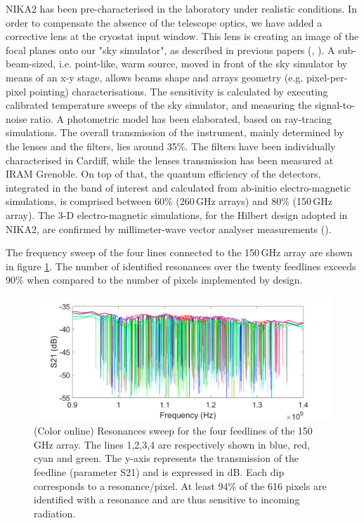 \documentclass[]{aa} %
\begin{document}
NIKA2 has been pre-characterised in the laboratory under realistic conditions. In order to compensate the absence of the telescope optics, we have added a corrective lens at the cryostat input window. This lens is creating an image of the focal planes onto our "sky simulator", as described in previous papers (\cite{Catalano2014}, \cite{Monfardini2011}). A sub-beam-sized, i.e. point-like, warm source, moved in front of the sky simulator by means of an x-y stage, allows beams shape and arrays geometry (e.g. pixel-per-pixel pointing) characterisations. The sensitivity is calculated by executing calibrated temperature sweeps of the sky simulator, and measuring the signal-to-noise ratio. A photometric model has been elaborated, based on ray-tracing simulations. The overall transmission of the instrument, mainly determined by the lenses and the filters, lies around 35\%. The filters have been individually characterised in Cardiff, while the lenses transmission has been measured at IRAM Grenoble. On top of that, the quantum efficiency of the detectors, integrated in the band of interest and calculated from ab-initio electro-magnetic simulations, is comprised between 60\% (260\,GHz arrays) and 80\% (150\,GHz array). The 3-D electro-magnetic simulations, for the Hilbert design adopted in NIKA2, are confirmed by millimeter-wave vector analyser measurements (\cite{Roesch2012}).

The frequency sweep of the four lines connected to the 150\,GHz array are shown in figure \ref{VNA}. The number of identified resonances over the twenty feedlines exceeds 90\% when compared to the number of pixels implemented by design. 

\begin{figure}[h]
\begin{center}
   \centering
    \includegraphics[width=1.0\linewidth]{VNA_scans_150GHz.png}
    \caption{(Color online) Resonances sweep for the four feedlines of the 150\,GHz array. The lines 1,2,3,4 are respectively shown in blue, red, cyan and green. The y-axis represents the transmission of the feedline (parameter S21) and is expressed in dB. Each dip corresponds to a resonance/pixel. At least 94\% of the 616 pixels are identified with a resonance and are thus sensitive to incoming radiation.}
         \label{VNA}
\end{center}
\end{figure}
\end{document}

